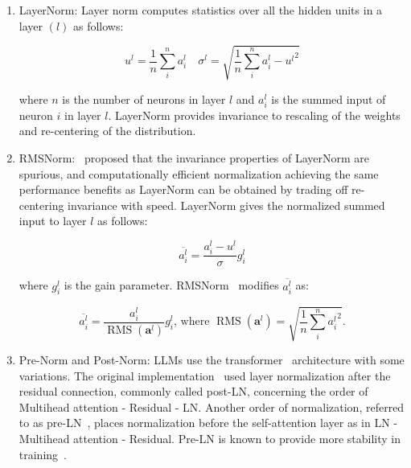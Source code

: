 \documentclass[a4paper,oneside]{book}
\begin{document}
\begin{enumerate}
    \item LayerNorm: Layer norm computes statistics over all the hidden units in a layer $(l)$ as follows:

          \begin{equation}
              u^{l} = \frac{1}{n} \sum_{i}^{n} a_{i}^{l} \quad \sigma^{l} = \sqrt{\frac{1}{n} \sum_{i}^{n}{a_{i}^{l}-u^{l}}^{2}}
          \end{equation}

          where $n$ is the number of neurons in layer $l$ and $a_{i}^{l}$ is the summed input of neuron $i$ in layer $l$. LayerNorm provides invariance to rescaling of the weights and re-centering of the distribution.

    \item RMSNorm:~\cite{zhang2019root} proposed that the invariance properties of LayerNorm are spurious, and computationally efficient normalization achieving the same performance benefits as LayerNorm can be obtained by trading off re-centering invariance with speed. LayerNorm gives the normalized summed input to layer $l$ as follows:

          \begin{equation}
              \overline{a_{i}^{l}} = \frac{a_{i}^{l}-u^{l}}{\sigma} g_{i}^{l}
          \end{equation}

          where $g_{i}^{l}$ is the gain parameter. RMSNorm~\cite{zhang2019root} modifies $\overline{a_{i}^{l}}$ as:

          \begin{equation}
              \overline{a_{i}^{l}} = \frac{a_{i}^{l}}{\operatorname{RMS}\left(\mathbf{a}^{l}\right)} g_{i}^{l} \text {, where } \operatorname{RMS}\left(\mathbf{a}^{l}\right) = \sqrt{\frac{1}{n} \sum_{i}^{n}{a_{i}^{l}}^{2}}.
          \end{equation}

    \item Pre-Norm and Post-Norm: LLMs use the transformer~\cite{vaswani2017attention} architecture with some variations. The original implementation~\cite{vaswani2017attention} used layer normalization after the residual connection, commonly called post-LN, concerning the order of Multihead attention - Residual - LN. Another order of normalization, referred to as pre-LN~\cite{baevski2018adaptive}, places normalization before the self-attention layer as in LN - Multihead attention - Residual. Pre-LN is known to provide more stability in training~\cite{shleifer2021normformer}.


\end{enumerate}
\end{document}

